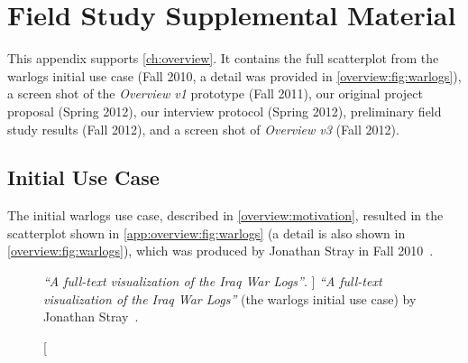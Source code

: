 
\chapter[Appendix: Field Study]{Field Study Supplemental Material}
\label{app:overview}


This appendix supports \autoref{ch:overview}. 
It contains the full scatterplot from the {\sc warlogs} initial use case (Fall 2010, a detail was provided in \autoref{overview:fig:warlogs}), a screen shot of the {\it Overview v1} prototype (Fall 2011), our original project proposal (Spring 2012), our interview protocol (Spring 2012), preliminary field study results (Fall 2012), and a screen shot of {\it Overview v3} (Fall 2012).

\section{Initial Use Case}
\label{app:overview:initial-use-case}


The initial {\sc warlogs} use case, described in \autoref{overview:motivation}, resulted in the scatterplot shown in \autoref{app:overview:fig:warlogs} (a detail is also shown in \autoref{overview:fig:warlogs}), which was produced by Jonathan Stray in Fall 2010~\cite{Stray2010}.


\begin{figure}
	\centering
	\caption
	[
	    \textsl{``A full-text visualization of the Iraq War Logs''}.
	]
	{
	    \textsl{``A full-text visualization of the Iraq War Logs''} (the {\sc warlogs} initial use case) by Jonathan Stray~\cite{Stray2010}.
	}
	\centering
	\label{app:overview:fig:warlogs}
\end{figure}

